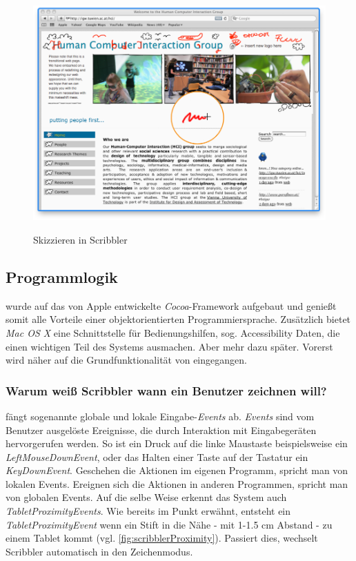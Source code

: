 \begin{figure}
        {\includegraphics[width=1\linewidth]{gfx/scribblerSketching}}
		\caption[Skizzieren in Scribbler]{Skizzieren in Scribbler}\label{fig:scribblerSketching}
\end{figure}

\subsection{Programmlogik} \label{sec:programmLogik}
\scribbler wurde auf das von Apple entwickelte \emph{Cocoa}-Framework aufgebaut und genießt somit alle Vorteile einer objektorientierten Programmiersprache. Zusätzlich bietet \emph{Mac OS X} eine Schnittstelle für Bedienungshilfen, sog. Accessibility Daten, die einen wichtigen Teil des Systems ausmachen. Aber mehr dazu später. Vorerst wird näher auf die Grundfunktionalität von \scribbler eingegangen.

\subsubsection* {Warum weiß Scribbler wann ein Benutzer zeichnen will?}
\scribbler fängt sogenannte globale und lokale Eingabe-\emph{Events} ab. \emph{Events} sind vom Benutzer ausgelöste Ereignisse, die durch Interaktion mit Eingabegeräten hervorgerufen werden. So ist ein Druck auf die linke Maustaste beispielsweise ein \emph{LeftMouseDownEvent}, oder das Halten einer Taste auf der Tastatur ein \emph{KeyDownEvent}. Geschehen die Aktionen im eigenen Programm, spricht man von lokalen Events. Ereignen sich die Aktionen in anderen Programmen, spricht man von globalen Events. Auf die selbe Weise erkennt das System auch \emph{TabletProximityEvents}. Wie bereits im Punkt  erwähnt, entsteht ein \emph{TabletProximityEvent} wenn ein Stift in die Nähe - mit 1-1.5 cm Abstand - zu einem Tablet kommt (vgl. \autoref{fig:scribblerProximity}). Passiert dies, wechselt Scribbler automatisch in den Zeichenmodus. 

